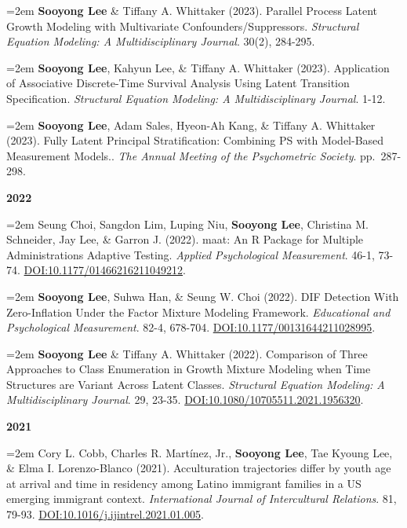 \documentclass[11pt,letterpaper,]{awesome-me}
\begin{document}
\hangindent=2em  \textbf{Sooyong Lee} \& Tiffany A.
Whittaker (2023). Parallel Process Latent Growth Modeling with
Multivariate Confounders/Suppressors. \emph{Structural Equation
Modeling: A Multidisciplinary Journal}. 30(2), 284-295.

\hangindent=2em  \textbf{Sooyong Lee}, Kahyun Lee, \&
Tiffany A. Whittaker (2023). Application of Associative Discrete-Time
Survival Analysis Using Latent Transition Specification.
\emph{Structural Equation Modeling: A Multidisciplinary Journal}. 1-12.

\hangindent=2em  \textbf{Sooyong Lee}, Adam Sales, Hyeon-Ah
Kang, \& Tiffany A. Whittaker (2023). Fully Latent Principal
Stratification: Combining PS with Model-Based Measurement Models..
\emph{The Annual Meeting of the Psychometric Society}. pp.~287-298.

\setlength{\leftskip}{0cm}

\textbf{2022}

\setlength{\leftskip}{0.5cm}

\hangindent=2em  Seung Choi, Sangdon Lim, Luping Niu,
\textbf{Sooyong Lee}, Christina M. Schneider, Jay Lee, \& Garron J.
(2022). maat: An R Package for Multiple Administrations Adaptive
Testing. \emph{Applied Psychological Measurement}. 46-1, 73-74.
\url{DOI:10.1177/01466216211049212}.

\hangindent=2em  \textbf{Sooyong Lee}, Suhwa Han, \& Seung
W. Choi (2022). DIF Detection With Zero-Inflation Under the Factor
Mixture Modeling Framework. \emph{Educational and Psychological
Measurement}. 82-4, 678-704. \url{DOI:10.1177/00131644211028995}.

\hangindent=2em  \textbf{Sooyong Lee} \& Tiffany A.
Whittaker (2022). Comparison of Three Approaches to Class Enumeration in
Growth Mixture Modeling when Time Structures are Variant Across Latent
Classes. \emph{Structural Equation Modeling: A Multidisciplinary
Journal}. 29, 23-35. \url{DOI:10.1080/10705511.2021.1956320}.

\setlength{\leftskip}{0cm}

\textbf{2021}

\setlength{\leftskip}{0.5cm}

\hangindent=2em  Cory L. Cobb, Charles R. Martínez, Jr.,
\textbf{Sooyong Lee}, Tae Kyoung Lee, \& Elma I. Lorenzo-Blanco (2021).
Acculturation trajectories differ by youth age at arrival and time in
residency among Latino immigrant families in a US emerging immigrant
context. \emph{International Journal of Intercultural Relations}. 81,
79-93. \url{DOI:10.1016/j.ijintrel.2021.01.005}.
\end{document}
